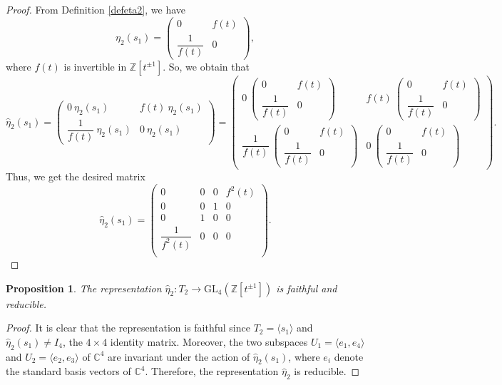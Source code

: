 \documentclass[reqno]{amsart}
\newtheorem{proposition}[theorem]{Proposition}
\begin{document}
\begin{proof}
From Definition \ref{defeta2}, we have
$$
\eta_2(s_1)=
\left( \begin{matrix}
0 & f(t)\\
\dfrac{1}{f(t)} & 0
\end{matrix}\right) ,
$$
where $f(t)$ is invertible in $ \mathbb{Z}[t^{\pm 1}]$. So, we obtain that
$$
\hat{\eta}_2(s_1)=
\left( \begin{matrix}
0\ \eta_2(s_1) & f(t)\ \eta_2(s_1)\\
\dfrac{1}{f(t)}\ \eta_2(s_1) & 0\ \eta_2(s_1)
\end{matrix}\right)=\left( \begin{matrix}
0\ \left( \begin{matrix}
0 & f(t)\\
\dfrac{1}{f(t)} & 0
\end{matrix}\right) & f(t)\ \left( \begin{matrix}
0 & f(t)\\
\dfrac{1}{f(t)} & 0
\end{matrix}\right)\\
\dfrac{1}{f(t)}\ \left( \begin{matrix}
0 & f(t)\\
\dfrac{1}{f(t)} & 0
\end{matrix}\right) & 0\ \left( \begin{matrix}
0 & f(t)\\
\dfrac{1}{f(t)} & 0
\end{matrix}\right)
\end{matrix}\right).
$$
Thus, we get the desired matrix
$$
\hat{\eta}_2(s_1)=
\left( \begin{matrix}
0 & 0 & 0 & f^2(t)\\
0 & 0 & 1 & 0\\
0 & 1 & 0 & 0\\
\dfrac{1}{f^2(t)} & 0 & 0 & 0\\
\end{matrix}\right).
$$
\end{proof}

\begin{proposition}
The representation $\hat{\eta}_2:T_2 \longrightarrow \mathrm{GL}_4(\mathbb{Z}[t^{\pm 1}])$ is faithful and reducible.
\end{proposition}

\begin{proof}
It is clear that the representation is faithful since $T_2=\langle s_1 \rangle$ and $\hat{\eta}_2(s_1)\neq I_4$, the $4\times 4$ identity matrix. Moreover, the two subspaces $U_1=\langle e_1, e_4 \rangle$ and $U_2=\langle e_2, e_3 \rangle$ of $\mathbb{C}^4$ are invariant under the action of $\hat{\eta}_2(s_1)$, where $e_i$ denote the standard basis vectors of $\mathbb{C}^4$. Therefore, the representation $\hat{\eta}_2$ is reducible.
\end{proof}
\end{document}
